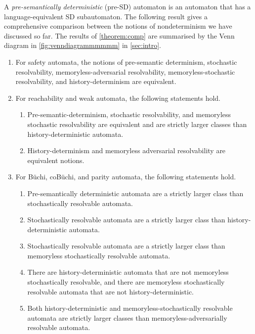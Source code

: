 A \emph{pre-semantically deterministic} (pre-SD) automaton is an automaton that has a language-equivalent SD subautomaton. The following result gives a comprehensive comparison between the notions of nondeterminism we have discussed so far. The results of \cref{theorem:comp} are summarised by the Venn diagram in \cref{fig:venndiagrammmmmm} in \cref{sec:intro}.  

\begin{theorem}\label{theorem:comp}
\begin{enumerate}
    \item For safety automata, the notions of pre-semantic determinism, stochastic resolvability, memoryless-adversarial resolvability, memoryless-stochastic resolvability, and history-determinism are equivalent.
    \item For reachability and weak automata, the following statements hold.
    \begin{enumerate}
        \item Pre-semantic-determinism, stochastic resolvability, and memoryless stochastic resolvability are equivalent and are strictly larger classes than history-deterministic automata.
        \item History-determinism and memoryless adversarial resolvability are equivalent notions.
    \end{enumerate}
    \item For B\"uchi, coB\"uchi, and parity automata, the following statements hold.
    \begin{enumerate}
        \item Pre-semantically deterministic automata are a strictly larger class than stochastically resolvable automata.
        \item Stochastically resolvable automata are a strictly larger class than history-deterministic automata.
        \item Stochastically resolvable automata are a strictly larger class than memoryless stochastically resolvable automata.
        \item There are history-deterministic automata that are not memoryless stochastically resolvable, and there are memoryless stochastically resolvable automata that are not history-deterministic.
        \item Both history-deterministic and memoryless-stochastically resolvable automata are strictly larger classes than memoryless-adversarially resolvable automata.
    \end{enumerate}
\end{enumerate}
\end{theorem}

